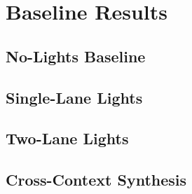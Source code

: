 \section{Baseline Results}

\subsection{No-Lights Baseline}

\subsection{Single-Lane Lights}

\subsection{Two-Lane Lights}

\subsection{Cross-Context Synthesis}